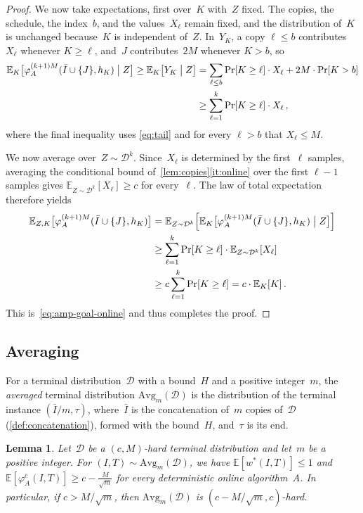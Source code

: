 \documentclass[11pt,letterpaper]{article}
\newtheorem{lemma}[theorem]{Lemma}
\theoremstyle{definition}
\theoremstyle{remark}
\newcommand{\E}{\mathbb{E}}
\newcommand{\cD}{\mathcal{D}}
\newcommand{\Avg}{\mathrm{Avg}}
\begin{document}
\begin{proof}
We now take expectations, first over~$K$ with~$Z$ fixed. The copies, the schedule, the index~$b$, and the values~$X_\ell$ remain fixed, and the distribution of~$K$ is unchanged because~$K$ is independent of~$Z$. In~$Y_K$, a copy $\ell\le b$ contributes~$X_\ell$ whenever $K\ge \ell$, and~$J$ contributes~$2M$ whenever $K>b$, so
\begin{align*}
  \E_K\bigl[\varphi_A^{(k+1)M}(\bar I\cup\{J\},h_K)\bigm|Z\bigr]
  \ge\E_K\bigl[Y_K\bigm|Z\bigr]
  &=\sum_{\ell\le b}\Pr[K\ge \ell]\cdot X_\ell+2M \cdot \Pr[K>b]\\*
  &\ge\sum_{\ell=1}^k\Pr[K\ge \ell]\cdot X_\ell\,,
\end{align*}
where the final inequality uses \eqref{eq:tail} and for every $\ell > b$ that $X_\ell \le M$.

We now average over~$Z\sim\cD^k$. Since~$X_\ell$ is determined by the first~$\ell$ samples, averaging the conditional bound of~\cref{lem:copies}\ref{it:online} over the first $\ell-1$ samples gives $\E_{Z\sim\cD^k}[X_\ell]\ge c$ for every~$\ell$. The law of total expectation therefore yields
\begin{align*}
  \E_{Z,K}\bigl[\varphi_A^{(k+1)M}(\bar I\cup\{J\},h_K)\bigr]
  &=\E_{Z\sim\cD^k}\Bigl[\E_K\bigl[\varphi_A^{(k+1)M}(\bar I\cup\{J\},h_K)\bigm|Z\bigr]\Bigr]\\
  &\ge\sum_{\ell=1}^k\Pr[K\ge \ell]\cdot \E_{Z\sim\cD^k}[X_\ell]\\
  &\ge c\sum_{\ell=1}^k\Pr[K\ge \ell]=c\cdot \E_K[K]\,.
\end{align*}
This is~\eqref{eq:amp-goal-online} and thus completes the proof.
\end{proof}

\subsection{Averaging}\label{sec:averaging}

For a terminal distribution~$\cD$ with a bound~$H$ and a positive integer~$m$, the \emph{averaged} terminal distribution $\Avg_m(\cD)$ is the distribution of the terminal instance $(\bar I/m,\tau)$, where~$\bar I$ is the concatenation of~$m$ copies of~$\cD$ (\cref{def:concatenation}), formed with the bound~$H$, and~$\tau$ is its end.

\begin{lemma}\label{lem:averaging}
Let~$\cD$ be a $(c,M)$-hard terminal distribution and let~$m$ be a positive integer. For $(I,T)\sim\Avg_m(\cD)$, we have $\E[w^*(I,T)]\le1$ and $\E[\varphi_A^c(I,T)]\ge c-\frac{M}{\sqrt m}$
for every deterministic online algorithm~$A$.
In particular, if $c>M/\sqrt m$, then $\Avg_m(\cD)$ is $(c-M/\sqrt m,c)$-hard.
\end{lemma}
\end{document}
